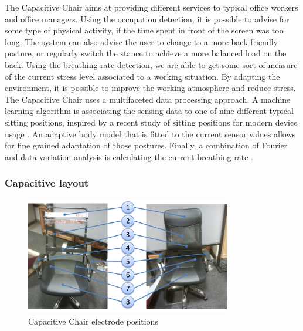 The Capacitive Chair aims at providing different services to typical office workers and office managers. Using the occupation detection, it is possible to advise for some type of physical activity, if the time spent in front of the screen was too long. The system can also advise the user to change to a more back-friendly posture, or regularly switch the stance to achieve a more balanced load on the back. Using the breathing rate detection, we are able to get some sort of measure of the current stress level associated to a working situation. By adapting the environment, it is possible to improve the working atmosphere and reduce stress. The Capacitive Chair uses a multifaceted data processing approach. A machine learning algorithm is associating the sensing data to one of nine different typical sitting positions, inspired by a recent study of sitting positions for modern device usage \cite{globalPosture}. An adaptive body model that is fitted to the current sensor values allows for fine grained adaptation of those postures. Finally, a combination of Fourier and data variation analysis is calculating the current breathing rate \cite{Braun2013ChairAid}.

\subsubsection{Capacitive layout}
\begin{figure}[ht]
\centering
\includegraphics[width=0.8\textwidth]{images/prot_capchair_electrode_layout}
\caption{Capacitive Chair electrode positions}
\label{fig:prot_capchair_electrode_layout}
\end{figure}

